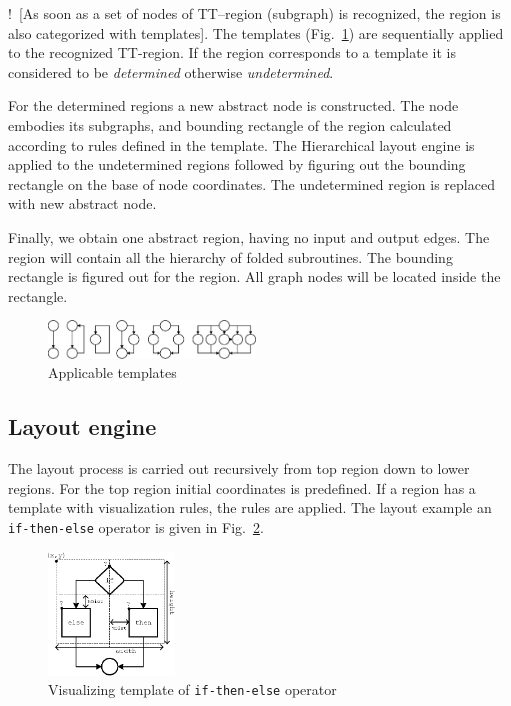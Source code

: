 \documentclass[conference]{IEEEtran}
\newcommand{\nnn}[2][ncolor]{\noindent%
\textcolor{eclr}{!\ [}\textcolor{#1}{#2}\textcolor{eclr}{]}}
\begin{document}

\nnn{As soon as a set of nodes of TT--region (subgraph) is recognized, the region is also categorized with templates}.  The templates (Fig.~\ref{fig:Regions}) are sequentially applied to the recognized TT-region.  If the region corresponds to a template it is considered to be \emph{determined} otherwise \emph{undetermined}.

For the determined regions a new abstract node is constructed.  The node embodies its subgraphs, and bounding rectangle of the region calculated according to rules defined in the template.  The Hierarchical layout engine is applied to the undetermined regions followed by figuring out the bounding rectangle on the base of node coordinates.  The undetermined region is replaced with new abstract node.

Finally, we obtain one abstract region, having no input and output edges.  The region will contain all the hierarchy of folded subroutines.  The bounding rectangle is figured out for the region.  All graph nodes will be located inside the rectangle.

\begin{figure}[htbp]
	\centering
		\includegraphics[width=0.49\textwidth]{Pic/Reg.eps}
	\caption{Applicable templates}
	\label{fig:Regions}
\end{figure}

\subsection{Layout engine}
\label{sec:raskladka-process}

The layout process is carried out recursively from top region down to lower regions.  For the top region initial coordinates is predefined.  If a region has a template with visualization rules, the rules are applied.  The layout example an \texttt{if-then-else} operator is given in Fig.~\ref{fig:IfThenElse}.

\begin{figure}[b]
	\centering
		\includegraphics[width=0.3\textwidth]{Pic/IfThenElse.eps}
	\caption{Visualizing template of \texttt{if-then-else} operator}
	\label{fig:IfThenElse}
\end{figure}
\end{document}

